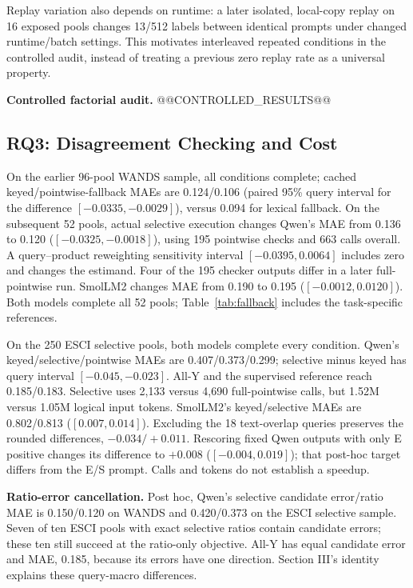 \documentclass[conference]{IEEEtran}
\begin{document}
Replay variation also depends on runtime: a later isolated, local-copy replay on 16 exposed pools changes 13/512 labels between identical prompts under changed runtime/batch settings. This motivates interleaved repeated conditions in the controlled audit, instead of treating a previous zero replay rate as a universal property.

\textbf{Controlled factorial audit.} @@CONTROLLED_RESULTS@@

\subsection{RQ3: Disagreement Checking and Cost}
On the earlier 96-pool WANDS sample, all conditions complete; cached keyed/pointwise-fallback MAEs are 0.124/0.106 (paired 95\% query interval for the difference $[-0.0335,-0.0029]$), versus 0.094 for lexical fallback. On the subsequent 52 pools, actual selective execution changes Qwen's MAE from 0.136 to 0.120 ($[-0.0325,-0.0018]$), using 195 pointwise checks and 663 calls overall. A query--product reweighting sensitivity interval $[-0.0395,0.0064]$ includes zero and changes the estimand. Four of the 195 checker outputs differ in a later full-pointwise run. SmolLM2 changes MAE from 0.190 to 0.195 ($[-0.0012,0.0120]$). Both models complete all 52 pools; Table~\ref{tab:fallback} includes the task-specific references.

On the 250 ESCI selective pools, both models complete every condition. Qwen's keyed/selective/pointwise MAEs are 0.407/0.373/0.299; selective minus keyed has query interval $[-0.045,-0.023]$. All-Y and the supervised reference reach 0.185/0.183. Selective uses 2,133 versus 4,690 full-pointwise calls, but 1.52M versus 1.05M logical input tokens. SmolLM2's keyed/selective MAEs are 0.802/0.813 ($[0.007,0.014]$). Excluding the 18 text-overlap queries preserves the rounded differences, $-0.034/+0.011$. Rescoring fixed Qwen outputs with only E positive changes its difference to $+0.008$ ($[-0.004,0.019]$); that post-hoc target differs from the E/S prompt. Calls and tokens do not establish a speedup.

\textbf{Ratio-error cancellation.} Post hoc, Qwen's selective candidate error/ratio MAE is 0.150/0.120 on WANDS and 0.420/0.373 on the ESCI selective sample. Seven of ten ESCI pools with exact selective ratios contain candidate errors; these ten still succeed at the ratio-only objective. All-Y has equal candidate error and MAE, 0.185, because its errors have one direction. Section III's identity explains these query-macro differences.
\end{document}
